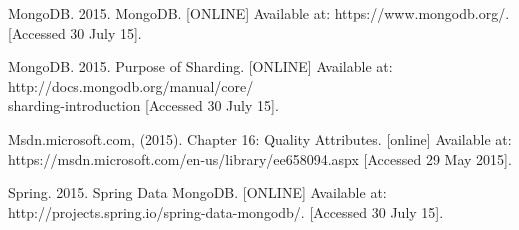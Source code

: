 \begin{thebibliography}{99}
	 MongoDB. 2015. MongoDB. [ONLINE] Available at: https://www.mongodb.org/. [Accessed 30 July 15].

	 MongoDB. 2015. Purpose of Sharding. [ONLINE] 
	Available at: http://docs.mongodb.org/manual/core/ \\sharding-introduction [Accessed 30 July 15].

	 Msdn.microsoft.com, (2015). Chapter 16: Quality Attributes. [online]
	 Available at: https://msdn.microsoft.com/en-us/library/ee658094.aspx [Accessed 29 May 2015].

	 Spring. 2015. Spring Data MongoDB. [ONLINE] Available at: http://projects.spring.io/spring-data-mongodb/. [Accessed 30 July 15].
	
	
	
\end{thebibliography}